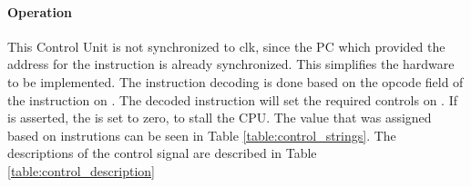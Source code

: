 \paragraph*{Operation}
This Control Unit is not synchronized to clk, since the PC which provided the address for the instruction is already synchronized.
This simplifies the hardware to be implemented.
The instruction decoding is done based on the opcode field of the instruction on .
The decoded instruction will set the required controls on .
If  is asserted, the  is set to zero, to stall the CPU.
The value that  was assigned based on instrutions can be seen in Table \ref{table:control_strings}.
The descriptions of the control signal are described in Table \ref{table:control_description}
\begin{table}[!h]
    \centering
    \caption{Controls Strings from Control Unit}
    \label{table:control_strings}
\end{table}

